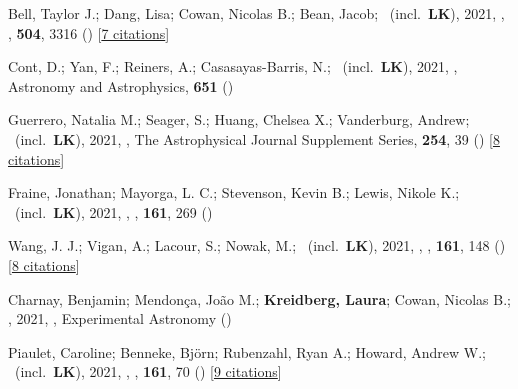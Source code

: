 \item[{\color{numcolor}\scriptsize56}] Bell, Taylor J.; Dang, Lisa; Cowan, Nicolas B.; Bean, Jacob; \etal\ (incl.\ \textbf{LK}), 2021, , \mnras, \textbf{504}, 3316 () [\href{https://ui.adsabs.harvard.edu/abs/2021MNRAS.504.3316B}{7 citations}]

\item[{\color{numcolor}\scriptsize55}] Cont, D.; Yan, F.; Reiners, A.; Casasayas-Barris, N.; \etal\ (incl.\ \textbf{LK}), 2021, , Astronomy and Astrophysics, \textbf{651} ()

\item[{\color{numcolor}\scriptsize54}] Guerrero, Natalia M.; Seager, S.; Huang, Chelsea X.; Vanderburg, Andrew; \etal\ (incl.\ \textbf{LK}), 2021, , The Astrophysical Journal Supplement Series, \textbf{254}, 39 () [\href{https://ui.adsabs.harvard.edu/abs/2021ApJS..254...39G}{8 citations}]

\item[{\color{numcolor}\scriptsize53}] Fraine, Jonathan; Mayorga, L. C.; Stevenson, Kevin B.; Lewis, Nikole K.; \etal\ (incl.\ \textbf{LK}), 2021, , \aj, \textbf{161}, 269 ()

\item[{\color{numcolor}\scriptsize52}] Wang, J. J.; Vigan, A.; Lacour, S.; Nowak, M.; \etal\ (incl.\ \textbf{LK}), 2021, , \aj, \textbf{161}, 148 () [\href{https://ui.adsabs.harvard.edu/abs/2021AJ....161..148W}{8 citations}]

\item[{\color{numcolor}\scriptsize51}] Charnay, Benjamin; Mendon{\c{c}}a, Jo{\~a}o M.; \textbf{Kreidberg, Laura}; Cowan, Nicolas B.; \etal, 2021, , Experimental Astronomy ()

\item[{\color{numcolor}\scriptsize50}] Piaulet, Caroline; Benneke, Bj{\"o}rn; Rubenzahl, Ryan A.; Howard, Andrew W.; \etal\ (incl.\ \textbf{LK}), 2021, , \aj, \textbf{161}, 70 () [\href{https://ui.adsabs.harvard.edu/abs/2021AJ....161...70P}{9 citations}]

